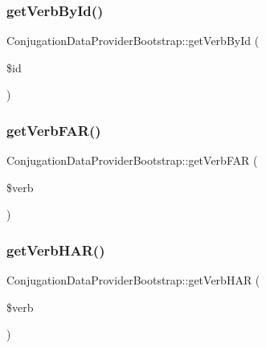 \hypertarget{class_conjugation_data_provider_bootstrap_ad0fde3743e27eff6e3e5249ca80018b8}{}\label{class_conjugation_data_provider_bootstrap_ad0fde3743e27eff6e3e5249ca80018b8} 
\subsubsection{\texorpdfstring{get\+Verb\+By\+Id()}{getVerbById()}}
{\footnotesize\ttfamily Conjugation\+Data\+Provider\+Bootstrap\+::get\+Verb\+By\+Id (\begin{DoxyParamCaption}\item[{}]{\$id }\end{DoxyParamCaption})}

\hypertarget{class_conjugation_data_provider_bootstrap_a3d74d3a3a754c871ac93d5a2196184b2}{}\label{class_conjugation_data_provider_bootstrap_a3d74d3a3a754c871ac93d5a2196184b2} 
\subsubsection{\texorpdfstring{get\+Verb\+F\+A\+R()}{getVerbFAR()}}
{\footnotesize\ttfamily Conjugation\+Data\+Provider\+Bootstrap\+::get\+Verb\+F\+AR (\begin{DoxyParamCaption}\item[{}]{\$verb }\end{DoxyParamCaption})}

\hypertarget{class_conjugation_data_provider_bootstrap_a97d65e8654cbcbb6910814dc9de5a6a8}{}\label{class_conjugation_data_provider_bootstrap_a97d65e8654cbcbb6910814dc9de5a6a8} 
\subsubsection{\texorpdfstring{get\+Verb\+H\+A\+R()}{getVerbHAR()}}
{\footnotesize\ttfamily Conjugation\+Data\+Provider\+Bootstrap\+::get\+Verb\+H\+AR (\begin{DoxyParamCaption}\item[{}]{\$verb }\end{DoxyParamCaption})}

